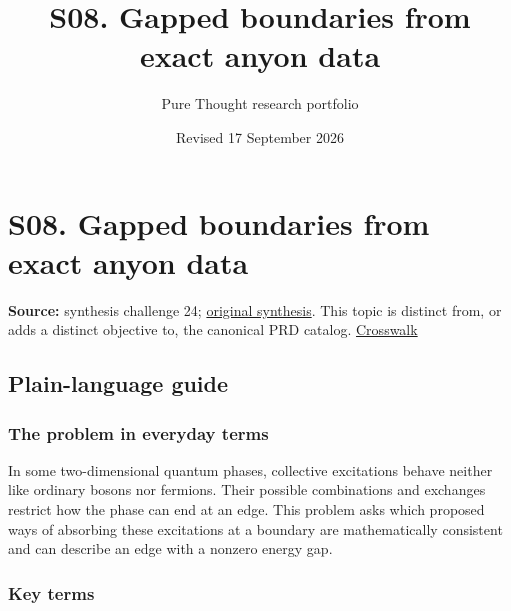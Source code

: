 \documentclass[
  11pt,
]{article}
\title{S08. Gapped boundaries from exact anyon data}
\author{Pure Thought research portfolio}
\date{Revised 17 September 2026}
\begin{document}
\maketitle
\thispagestyle{empty}
\clearpage

\section{S08. Gapped boundaries from exact anyon data}

\textbf{Source:} synthesis challenge 24;
\href{https://github.com/rick-stevens-ai/Pure-Thought/blob/main/NOTES/30-Most-Compelling-Pure-Thought-AI-Challenges.md}{original
synthesis}. This topic is distinct from, or adds a distinct objective
to, the canonical PRD catalog.
\href{https://github.com/rick-stevens-ai/Pure-Thought/blob/main/reviews/SYNTHESIS-CROSSWALK.md}{Crosswalk}

\subsection{Plain-language guide}

\subsubsection{The problem in everyday terms}

In some two-dimensional quantum phases, collective excitations behave
neither like ordinary bosons nor fermions. Their possible combinations
and exchanges restrict how the phase can end at an edge. This problem
asks which proposed ways of absorbing these excitations at a boundary
are mathematically consistent and can describe an edge with a nonzero
energy gap.

\subsubsection{Key terms}
\end{document}
